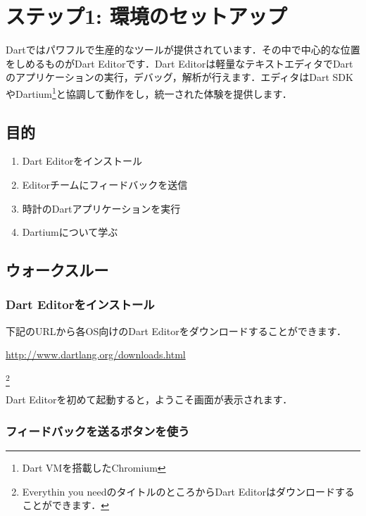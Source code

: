 \chapter*{ステップ1: 環境のセットアップ}
\addtocounter{chapter}{1}

Dartではパワフルで生産的なツールが提供されています．その中で中心的な位置をしめるものがDart Editorです．Dart Editorは軽量なテキストエディタでDartのアプリケーションの実行，デバッグ，解析が行えます．エディタはDart SDKやDartium\footnote{Dart VMを搭載したChromium}と協調して動作をし，統一された体験を提供します．

\section{目的}

\begin{enumerate}
\item Dart Editorをインストール
\item Editorチームにフィードバックを送信
\item 時計のDartアプリケーションを実行
\item Dartiumについて学ぶ
\end{enumerate}

\section{ウォークスルー}

\subsection{Dart Editorをインストール}

下記のURLから各OS向けのDart Editorをダウンロードすることができます．

\vspace{5mm}
\url{http://www.dartlang.org/downloads.html}
\vspace{5mm}

\footnote{Everythin you needのタイトルのところからDart Editorはダウンロードすることができます．}

Dart Editorを初めて起動すると，ようこそ画面が表示されます．


\subsection{フィードバックを送るボタンを使う}

